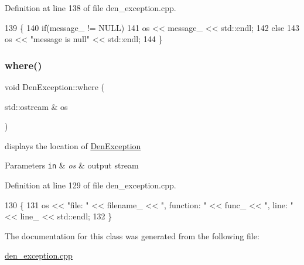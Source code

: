 Definition at line 138 of file den\+\_\+exception.\+cpp.


\begin{DoxyCode}
139   \{
140     \textcolor{keywordflow}{if}(message\_ != NULL)
141       os << message\_ << std::endl;
142     \textcolor{keywordflow}{else}
143       os << \textcolor{stringliteral}{"message is null"} << std::endl;
144   \}
\end{DoxyCode}
\mbox{\label{classDenException_a9ea40d7917b2148f9183ce63bde612a8}} 
\subsubsection{\texorpdfstring{where()}{where()}}
{\footnotesize\ttfamily void Den\+Exception\+::where (\begin{DoxyParamCaption}\item[{std\+::ostream \&}]{os }\end{DoxyParamCaption})}



displays the location of \hyperlink{classDenException}{Den\+Exception} 


\begin{DoxyParams}[1]{Parameters}
\mbox{\tt in}  & {\em os} & output stream \\
\hline
\end{DoxyParams}


Definition at line 129 of file den\+\_\+exception.\+cpp.


\begin{DoxyCode}
130   \{
131     os << \textcolor{stringliteral}{"file: "} << filename\_ << \textcolor{stringliteral}{", function: "} << func\_ << \textcolor{stringliteral}{", line: "} << line\_ << std::endl;
132   \}
\end{DoxyCode}


The documentation for this class was generated from the following file\+:\begin{DoxyCompactItemize}
\item 
\hyperlink{den__exception_8cpp}{den\+\_\+exception.\+cpp}\end{DoxyCompactItemize}
